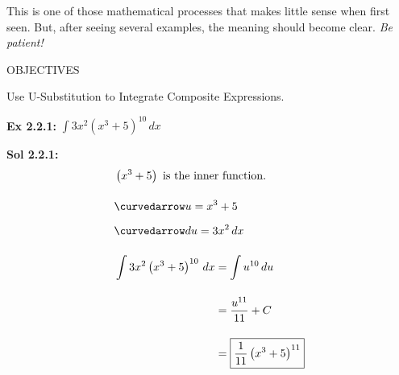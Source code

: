 This is one of those mathematical processes that makes little sense when first seen. But, after seeing several examples, the meaning should become clear. \textit{Be patient!} \par

\begin{tcolorbox}[objective]
    \begin{center}
        OBJECTIVES \\[11pt]
    \end{center}
    Use U-Substitution to Integrate Composite Expressions. 
\end{tcolorbox} \vspace{11pt}

\begin{tcolorbox}[example]
    \textbf{Ex 2.2.1: } $\int 3x^2\left(x^3 + 5\right)^{10} \, dx$
\end{tcolorbox}
\begin{tcolorbox}[solution]
    \textbf{Sol 2.2.1: } \begin{align*}
        & \left(x^3 + 5\right) \text{ is the inner function.} \\[11pt]
        & \curvedarrow u = x^3 + 5 \\[5.5pt]
        & \curvedarrow du = 3x^2 \, dx \\[11pt]
        & \int 3x^2\left(x^3 + 5\right)^{10} \, dx \begin{aligned}[t]
            & = \int u^{10} \, du \\[11pt]
            & = \dfrac{u^{11}}{11} + C \\[11pt]
            & = \boxed{\dfrac{1}{11}\left(x^3 + 5\right)^{11}}
        \end{aligned}
    \end{align*}
\end{tcolorbox} \vspace{11pt}

